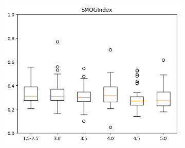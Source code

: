 \documentclass[12pt,journal,compsoc]{IEEEtran}
\begin{document}
\begin{figure}[H]
\begin{subfigure}{0.27\textwidth}
\includegraphics[scale=0.41]{../unigrams/scripts/boxplots/SMOGIndex.png}
\end{subfigure}
\end{figure}
\end{document}
